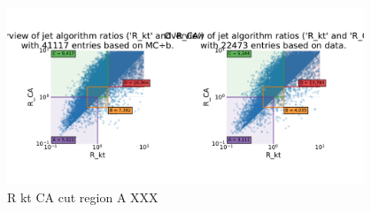 \begin{figure}
  \includegraphics[width=0.95\textwidth, trim=0 0 0 30, clip, page=2]{figures/quarks/gtag-R_kt_CA_overview-down_sample=1.00-ML_vars=vertex-selection=b-ejet_min=4-n_iter_RS_lgb=99-n_iter_RS_xgb=9-cdot_cut=0.90-version=19-njet=4}
  \caption[R kt CA cut region A  XXX \TODO]
          {R kt CA cut region A XXX \TODO
          } 
  \label{fig:q:R_kt_CA_cut_A}
\end{figure}
